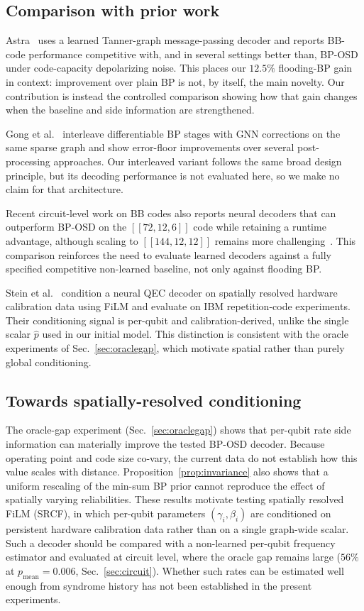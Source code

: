 \documentclass[a4paper,twocolumn,11pt,nopdfoutputerror]{quantumarticle}
\newcommand{\phat}{\hat{p}}
\newcommand{\code}[3]{\ensuremath{[\![#1,#2,#3]\!]}}
\begin{document}
\subsection{Comparison with prior work}\label{sec:priorwork}

Astra~\cite{Maan2025MLBP} uses a learned Tanner-graph message-passing
decoder and reports BB-code performance competitive with, and in several
settings better than, BP-OSD under code-capacity depolarizing noise. This
places our $12.5\%$ flooding-BP gain in context: improvement over plain BP
is not, by itself, the main novelty. Our contribution is instead the
controlled comparison showing how that gain changes when the baseline
and side information are strengthened.

Gong et al.~\cite{Gong2024GNN} interleave differentiable BP stages with
GNN corrections on the same sparse graph and show error-floor
improvements over several post-processing approaches. Our interleaved
variant follows the same broad design principle, but its decoding
performance is not evaluated here, so we make no claim for that
architecture.

Recent circuit-level work on BB codes also reports neural decoders that
can outperform BP-OSD on the $\code{72}{12}{6}$ code while retaining a
runtime advantage, although scaling to $\code{144}{12}{12}$ remains more
challenging~\cite{Blue2026MLBB}. This comparison reinforces the need to evaluate learned decoders against
a fully specified competitive non-learned baseline, not only against
flooding BP.

Stein et al.~\cite{Stein2026FiLM} condition a neural QEC decoder on
spatially resolved hardware calibration data using FiLM and evaluate on
IBM repetition-code experiments. Their conditioning signal is per-qubit
and calibration-derived, unlike the single scalar $\phat$ used in our
initial model. This distinction is consistent with the oracle experiments
of Sec.~\ref{sec:oraclegap}, which motivate spatial rather than purely
global conditioning.
\subsection{Towards spatially-resolved conditioning}\label{sec:srcf}

The oracle-gap experiment (Sec.~\ref{sec:oraclegap}) shows that
per-qubit rate side information can materially improve the tested
BP-OSD decoder. Because operating point and code size co-vary, the
current data do not establish how this value scales with distance.
Proposition~\ref{prop:invariance} also shows that a uniform rescaling
of the min-sum BP prior cannot reproduce the effect of spatially varying
reliabilities. These results motivate testing spatially resolved FiLM
(SRCF), in which per-qubit parameters $(\gamma_i, \beta_i)$ are
conditioned on persistent hardware calibration data rather than on a
single graph-wide scalar. Such a decoder should be compared with a non-learned per-qubit frequency
estimator and evaluated at circuit level, where the oracle gap remains
large ($56\%$ at $p_\mathrm{mean}=0.006$, Sec.~\ref{sec:circuit}).
Whether such rates can be estimated well enough from syndrome history has
not been established in the present experiments.
\end{document}
